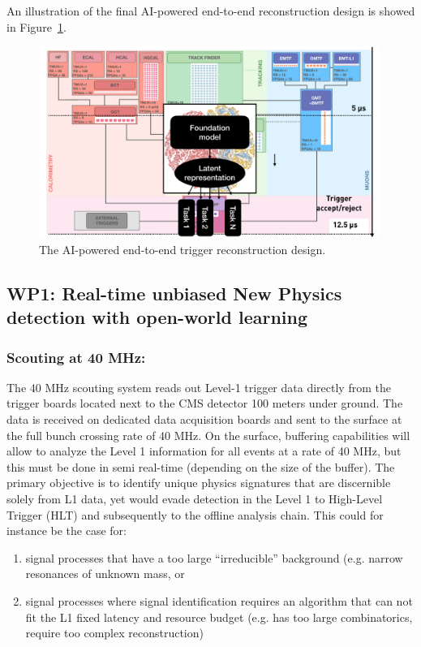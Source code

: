 \documentclass[12pt]{iopart}
\begin{document}
An illustration of the final AI-powered end-to-end reconstruction design is showed in Figure~\ref{fig:e2e}.

\begin{figure}[t!]
    \centering
    \includegraphics[width=0.99\textwidth]{figures/end_to_end.pdf}
    \caption{The AI-powered end-to-end trigger reconstruction design.}
    \label{fig:e2e}
\end{figure}


\subsection{WP1: Real-time unbiased New Physics detection with open-world learning}
\subsubsection{Scouting at 40 MHz:}
The 40 MHz scouting system reads out Level-1 trigger data directly from the trigger boards located next to the CMS detector 100 meters under ground. The data is received on dedicated data acquisition boards and sent to the surface at the full bunch crossing rate of 40 MHz. On the surface, buffering capabilities will allow to analyze the Level 1 information for all events at a rate of 40 MHz, but this must be done in semi real-time (depending on the size of the buffer). 
The primary objective is to identify unique physics signatures that are discernible solely from L1 data, yet would evade detection in the Level 1 to High-Level Trigger (HLT) and subsequently to the offline analysis chain. This could for instance be the case for:
\begin{enumerate}
    \item signal processes that have a too large “irreducible” background (e.g. narrow resonances of unknown mass, or
    \item signal processes where signal identification requires an algorithm that can not fit the L1 fixed latency and resource budget (e.g. has too large combinatorics, require too complex reconstruction)
\end{enumerate}
\end{document}
